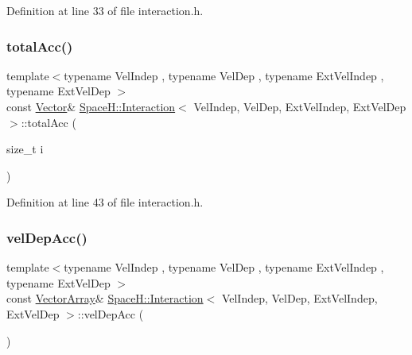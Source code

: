 Definition at line 33 of file interaction.\+h.

\mbox{\label{class_space_h_1_1_interaction_abb0464f58a3410788de0d3eb4ff76867}} 
\subsubsection{\texorpdfstring{total\+Acc()}{totalAcc()}\hspace{0.1cm}{\footnotesize\ttfamily [2/2]}}
{\footnotesize\ttfamily template$<$typename Vel\+Indep , typename Vel\+Dep , typename Ext\+Vel\+Indep , typename Ext\+Vel\+Dep $>$ \\
const \mbox{\hyperlink{class_space_h_1_1_interaction_ad6d656d30b9272a5f690b0412a4a9a86}{Vector}}\& \mbox{\hyperlink{class_space_h_1_1_interaction}{Space\+H\+::\+Interaction}}$<$ Vel\+Indep, Vel\+Dep, Ext\+Vel\+Indep, Ext\+Vel\+Dep $>$\+::total\+Acc (\begin{DoxyParamCaption}\item[{size\+\_\+t}]{i }\end{DoxyParamCaption})\hspace{0.3cm}{\ttfamily [inline]}}



Definition at line 43 of file interaction.\+h.

\mbox{\label{class_space_h_1_1_interaction_a87ecd610557033d30958f4eb420b8f88}} 
\subsubsection{\texorpdfstring{vel\+Dep\+Acc()}{velDepAcc()}\hspace{0.1cm}{\footnotesize\ttfamily [1/2]}}
{\footnotesize\ttfamily template$<$typename Vel\+Indep , typename Vel\+Dep , typename Ext\+Vel\+Indep , typename Ext\+Vel\+Dep $>$ \\
const \mbox{\hyperlink{class_space_h_1_1_interaction_a9aaccf9a34d875881d9448acf7aaf009}{Vector\+Array}}\& \mbox{\hyperlink{class_space_h_1_1_interaction}{Space\+H\+::\+Interaction}}$<$ Vel\+Indep, Vel\+Dep, Ext\+Vel\+Indep, Ext\+Vel\+Dep $>$\+::vel\+Dep\+Acc (\begin{DoxyParamCaption}{ }\end{DoxyParamCaption})\hspace{0.3cm}{\ttfamily [inline]}}



